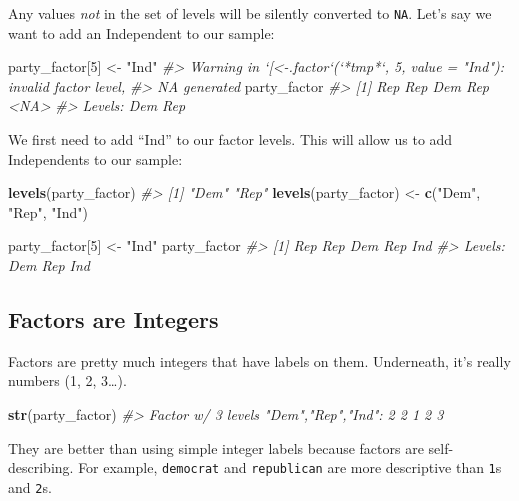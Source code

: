 \documentclass[]{book}
\newenvironment{Shaded}{\begin{snugshade}}{\end{snugshade}}
\newcommand{\CommentTok}[1]{\textcolor[rgb]{0.56,0.35,0.01}{\textit{#1}}}
\newcommand{\DecValTok}[1]{\textcolor[rgb]{0.00,0.00,0.81}{#1}}
\newcommand{\KeywordTok}[1]{\textcolor[rgb]{0.13,0.29,0.53}{\textbf{#1}}}
\newcommand{\NormalTok}[1]{#1}
\newcommand{\StringTok}[1]{\textcolor[rgb]{0.31,0.60,0.02}{#1}}
\begin{document}
Any values \emph{not} in the set of levels will be silently converted to \texttt{NA}. Let's say we want to add an Independent to our sample:

\begin{Shaded}
\begin{Highlighting}[]
\NormalTok{party_factor[}\DecValTok{5}\NormalTok{] <-}\StringTok{ "Ind"}
\CommentTok{#> Warning in `[<-.factor`(`*tmp*`, 5, value = "Ind"): invalid factor level,}
\CommentTok{#> NA generated}
\NormalTok{party_factor}
\CommentTok{#> [1] Rep  Rep  Dem  Rep  <NA>}
\CommentTok{#> Levels: Dem Rep}
\end{Highlighting}
\end{Shaded}

We first need to add ``Ind'' to our factor levels. This will allow us to add Independents to our sample:

\begin{Shaded}
\begin{Highlighting}[]
\KeywordTok{levels}\NormalTok{(party_factor)}
\CommentTok{#> [1] "Dem" "Rep"}
\KeywordTok{levels}\NormalTok{(party_factor) <-}\StringTok{ }\KeywordTok{c}\NormalTok{(}\StringTok{"Dem"}\NormalTok{, }\StringTok{"Rep"}\NormalTok{, }\StringTok{"Ind"}\NormalTok{)}

\NormalTok{party_factor[}\DecValTok{5}\NormalTok{] <-}\StringTok{ "Ind"}
\NormalTok{party_factor}
\CommentTok{#> [1] Rep Rep Dem Rep Ind}
\CommentTok{#> Levels: Dem Rep Ind}
\end{Highlighting}
\end{Shaded}

\hypertarget{factors-are-integers}{%
\subsection{Factors are Integers}\label{factors-are-integers}}

Factors are pretty much integers that have labels on them. Underneath, it's really numbers (1, 2, 3\ldots{}).

\begin{Shaded}
\begin{Highlighting}[]
\KeywordTok{str}\NormalTok{(party_factor)}
\CommentTok{#>  Factor w/ 3 levels "Dem","Rep","Ind": 2 2 1 2 3}
\end{Highlighting}
\end{Shaded}

They are better than using simple integer labels because factors are self-describing. For example, \texttt{democrat} and \texttt{republican} are more descriptive than \texttt{1}s and \texttt{2}s.
\end{document}
